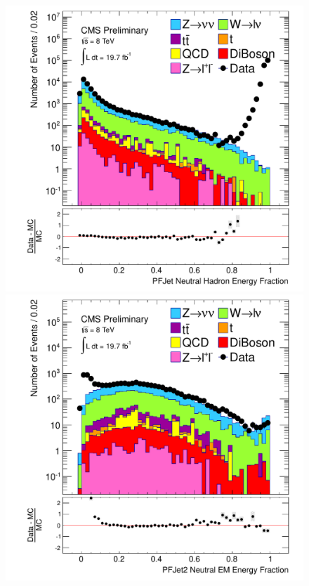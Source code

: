 \begin{figure}[!Hhtb]
\begin{center}
  \includegraphics[scale=0.31]     {Figures/sus13009/nocut/prelimLabels/PFAK5JetNeuHadEngFrac.pdf}
  \includegraphics[scale=0.31]     {Figures/sus13009/nocut/prelimLabels/PFAK5JetNeuEmEngFrac2.pdf}

\end{center}
\end{figure}
